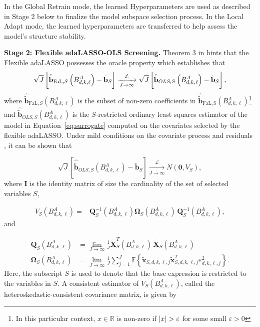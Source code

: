 \documentclass{rQUF2e}
\newcommand{\R}{\mathbb{R}}
\newcommand{\E}{\mathbb{E}}
\theoremstyle{plain}
\theoremstyle{definition}
\theoremstyle{remark}
\DeclarePairedDelimiter{\aval}{\lvert}{\rvert} %
\begin{document}
In the Global Retrain mode, the learned Hyperparameters are used as described in Stage 2 below to finalize the model subspace selection process. In the Local Adapt mode, the learned hyperparameters are transferred to help assess the model's structure stability.
\medskip

\noindent\textbf{Stage 2: Flexible adaLASSO-OLS Screening.} Theorem 3 in \citet{MEDEIROS2016255} hints that the Flexible adaLASSO possesses the oracle property which establishes that
$$
    \sqrt{J} \left[\hat{\tilde{\mathbf{b}}}_{\mathrm{FaL},S} \left( B^A_{d, k, \ell} \right) - \tilde{\mathbf{b}}_S \right] \xrightarrow[J \rightarrow \infty]{\mathcal{L}}\\ \sqrt{J} \left[\hat{\tilde{\mathbf{b}}}_{OLS, S} \left( B^A_{d, k, \ell} \right) - \tilde{\mathbf{b}}_S\right],
$$
where $\hat{\tilde{\mathbf{b}}}_{\mathrm{FaL},S}\left( B^A_{d, k, \ell} \right)$ is the subset of non-zero coefficients in $\hat{\tilde{\mathbf{b}}}_{\mathrm{FaL,S}}\left( B^A_{d, k, \ell} \right)$\footnote{In this particular context, $x \in \R$ is non-zero if $\aval{x} > \varepsilon$ for some small $\varepsilon > 0$} and $\hat{\tilde{\mathbf{b}}}_{OLS, S}\left( B^A_{d, k, \ell} \right)$ is the $S$-restricted ordinary least squares estimator of the model in Equation~\eqref{eq:surrogate} computed on the covariates selected by the flexible adaLASSO. Under mild conditions on the covariate process and residuals \citep[see Proposition~8.3. in][]{hamilton_time_1994}, it can be shown that

$$
    \sqrt{J}\left[\hat{\tilde{\mathbf{b}}}_{OLS,S} \left( B^A_{d, k, \ell} \right) - \tilde{\mathbf{b}}_S \right]  \xrightarrow[J \rightarrow \infty]{\mathcal{L}} N(\mathbf{0}, V_S),
$$
where $\mathbf{I}$ is the identity matrix of size the cardinality of the set of selected variables $S$,

\begin{align*}
    V_{S} \left( B^A_{d, k, \ell} \right)
    ={} &
    \mathbf{Q}^{-1}_S\left(B^A_{d,k,\ell}\right)\mathbf{\Omega}_S\left(B^A_{d,k,\ell}\right) \, \mathbf{Q}^{-1}_S\left(B^A_{d,k,\ell}\right),
\end{align*}
and

\begin{align*}
    \mathbf{Q}_S\left(B^A_{d,k,\ell}\right)      & = \lim_{J \rightarrow \infty} \frac{1}{J}\tilde{\mathbf{X}}_{S}^T(B^A_{d,k,\ell})
    \,\tilde{\mathbf{X}}_{S}(B^A_{d,k,\ell})                                                                                                                                                                                          \\
    \mathbf{\Omega}_S\left(B^A_{d,k,\ell}\right) & = \lim_{J \rightarrow \infty} \frac{1}{J} \sum^J_{j = 1} \E \left \{ \tilde{\mathbf{x}}_{S,d,k,\ell,j} \tilde{\mathbf{x}}_{S,d,k,\ell,j}^T \varepsilon^2_{d, k, \ell, j} \right\}.
\end{align*}
Here, the subscript $S$ is used to denote that the base expression is restricted to the variables in $S$. A consistent estimator of $V_S\left( B^A_{d,k,\ell} \right)$, called the heteroskedastic-consistent covariance matrix, is given by
\end{document}
